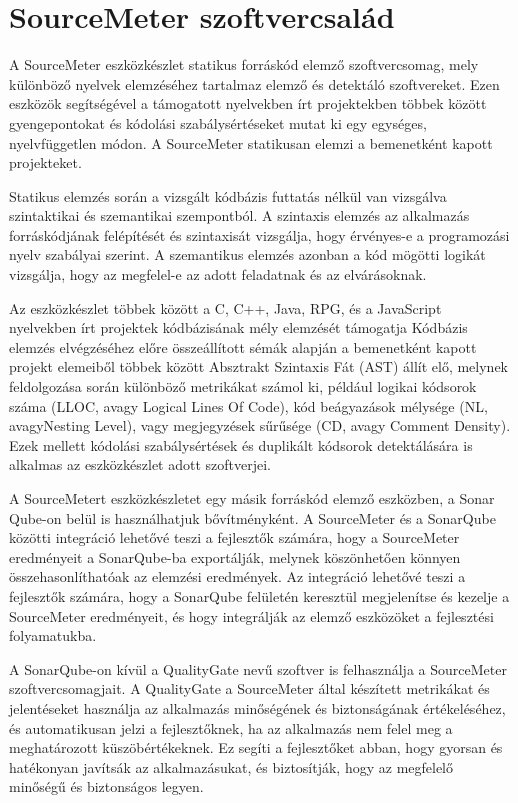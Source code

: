 \chapter{SourceMeter szoftvercsalád}
\label{chap:fejezet2}

A SourceMeter eszközkészlet statikus forráskód elemző szoftvercsomag, mely különböző nyelvek elemzéséhez tartalmaz elemző és detektáló szoftvereket. Ezen eszközök segítségével a támogatott nyelvekben írt projektekben többek között gyengepontokat és kódolási szabálysértéseket mutat ki egy egységes, nyelvfüggetlen módon.
A SourceMeter statikusan elemzi a bemenetként kapott projekteket. 

Statikus elemzés során a vizsgált kódbázis futtatás nélkül van vizsgálva szintaktikai és szemantikai szempontból. A szintaxis elemzés az alkalmazás forráskódjának felépítését és szintaxisát vizsgálja, hogy érvényes-e a programozási nyelv szabályai szerint. A szemantikus elemzés azonban a kód mögötti logikát vizsgálja, hogy az megfelel-e az adott feladatnak és az elvárásoknak. 

Az eszközkészlet többek között a C, C++, Java, RPG, és a JavaScript nyelvekben írt projektek kódbázisának mély elemzését támogatja 
Kódbázis elemzés elvégzéséhez előre összeállított sémák alapján a bemenetként kapott projekt elemeiből többek között Absztrakt Szintaxis Fát (AST) állít elő, melynek feldolgozása során különböző metrikákat számol ki, például logikai kódsorok száma (LLOC, avagy Logical Lines Of Code), kód beágyazások mélysége (NL, avagyNesting Level), vagy megjegyzések sűrűsége (CD, avagy Comment Density). Ezek mellett kódolási szabálysértések és duplikált kódsorok detektálására is alkalmas az eszközkészlet adott szoftverjei.

A SourceMetert eszközkészletet egy másik forráskód elemző eszközben, a Sonar Qube-on belül is használhatjuk bővítményként. A SourceMeter és a SonarQube közötti integráció lehetővé teszi a fejlesztők számára, hogy a SourceMeter eredményeit a SonarQube-ba exportálják, melynek köszönhetően könnyen összehasonlíthatóak az elemzési eredmények. Az integráció lehetővé teszi a fejlesztők számára, hogy a SonarQube felületén keresztül megjelenítse és kezelje a SourceMeter eredményeit, és hogy integrálják az elemző eszközöket a fejlesztési folyamatukba.

A SonarQube-on kívül a QualityGate nevű szoftver is felhasználja a SourceMeter szoftvercsomagjait. A QualityGate a SourceMeter által készített metrikákat és jelentéseket használja az alkalmazás minőségének és biztonságának értékeléséhez, és automatikusan jelzi a fejlesztőknek, ha az alkalmazás nem felel meg a meghatározott küszöbértékeknek. Ez segíti a fejlesztőket abban, hogy gyorsan és hatékonyan javítsák az alkalmazásukat, és biztosítják, hogy az megfelelő minőségű és biztonságos legyen.

